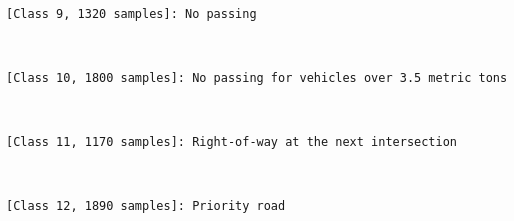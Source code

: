 \documentclass[11pt]{article}
\begin{document}
    \begin{center}
    \end{center}
    { \hspace*{\fill} \\}
    
    \begin{Verbatim}[commandchars=\\\{\}]
[Class 9, 1320 samples]: No passing

    \end{Verbatim}

    \begin{center}
    \end{center}
    { \hspace*{\fill} \\}
    
    \begin{Verbatim}[commandchars=\\\{\}]
[Class 10, 1800 samples]: No passing for vehicles over 3.5 metric tons

    \end{Verbatim}

    \begin{center}
    \end{center}
    { \hspace*{\fill} \\}
    
    \begin{Verbatim}[commandchars=\\\{\}]
[Class 11, 1170 samples]: Right-of-way at the next intersection

    \end{Verbatim}

    \begin{center}
    \end{center}
    { \hspace*{\fill} \\}
    
    \begin{Verbatim}[commandchars=\\\{\}]
[Class 12, 1890 samples]: Priority road

    \end{Verbatim}
\end{document}

